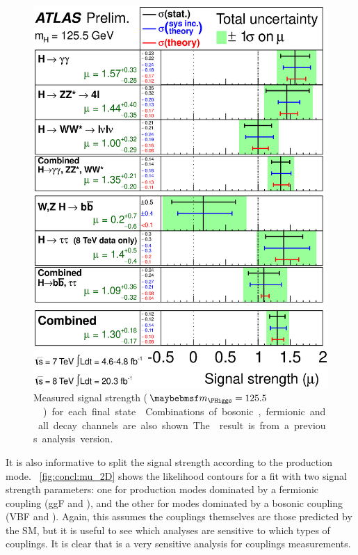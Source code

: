 \begin{figure}[t]
	\includegraphics[width=\mediumfigwidth]{tex/conclusions/atlas_mu}
	\caption{Measured signal strength (\unit{$\mH = 125.5$}{\GeV}) for each final state 
	\cite{ATLAS:couplings:Moriond14}. Combinations of bosonic, fermionic and all decay 
	channels are also shown. The \HWW result is from a previous analysis version.}
	\label{fig:concl:mu}
\end{figure}

It is also informative to split the signal strength according to the production mode. 
\Figure~\ref{fig:concl:mu_2D} shows the likelihood contours for a fit with two signal 
strength parameters: one for production modes dominated by a fermionic coupling (ggF and 
\ttH), and the other for modes dominated by a bosonic coupling (VBF and \VH). Again, this 
assumes the couplings themselves are those predicted by the SM, but it is useful 
to see which analyses are sensitive to which types of couplings. It is clear that \HWW is 
a very sensitive analysis for couplings measurements.

